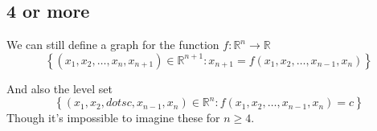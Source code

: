 \documentclass[11pt]{book}
\begin{document}
\subsection{4 or more}%
\label{sub:4_or_more}

We can still define a graph for the function $f : \mathbb{R} ^{n}  \to \mathbb{R}  $ 
\[
    \left\{ \left( x_{1} , x_{2} , \dotsc  , x_{n } , x_{n + 1}  \right) \in \mathbb{R} ^{n + 1} : x_{n + 1} = f\left(x_{1} , x_{2} , \dotsc  , x_{n - 1} , x_{n} \right)   \right\} 
\]

And also the level set
\[
    \left\{ \left( x_{1} ,  x_{2} ,  dotsc ,  x_{n - 1} ,  x_{n}  \right) \in \mathbb{R} ^{n} : f\left(x_{1} , x_{2} , \dotsc  , x_{n - 1} , x_{n} \right) = c \right\} 
\]
Though it's impossible to imagine these for $n\ge 4$. 





\end{document}

